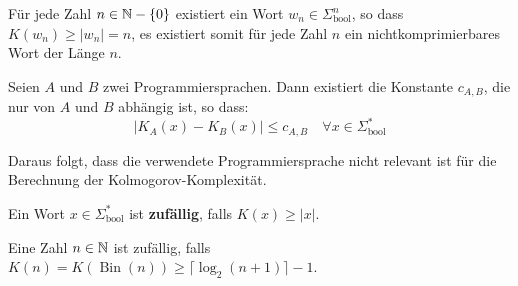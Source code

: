 \begin{lemma}
Für jede Zahl $n \in \mathbb{N} - \{0\}$ existiert ein Wort $w_n \in \Sigma_\text{bool}^n$, so dass $K(w_n) \geq |w_n| = n$, es existiert somit für jede Zahl $n$ ein nichtkomprimierbares Wort der Länge $n$.\\
\end{lemma}

\begin{satz}
Seien $A$ und $B$ zwei Programmiersprachen. Dann existiert die Konstante $c_{A, B}$, die nur von $A$ und $B$ abhängig ist, so dass:
\[
|K_A(x) - K_B(x)| \leq c_{A, B} \quad \forall x \in \Sigma_\text{bool}^*
\]

Daraus folgt, dass die verwendete Programmiersprache nicht relevant ist für die Berechnung der Kolmogorov-Komplexität.\\
\end{satz}

\begin{definition}
Ein Wort $x \in \Sigma_\text{bool}^*$ ist \textbf{zufällig}, falls $K(x) \geq |x|$.

Eine Zahl $n \in \mathbb{N}$ ist zufällig, falls $K(n) = K(\operatorname{Bin}(n)) \geq \lceil \log_2(n+1) \rceil -1$.
\end{definition}

